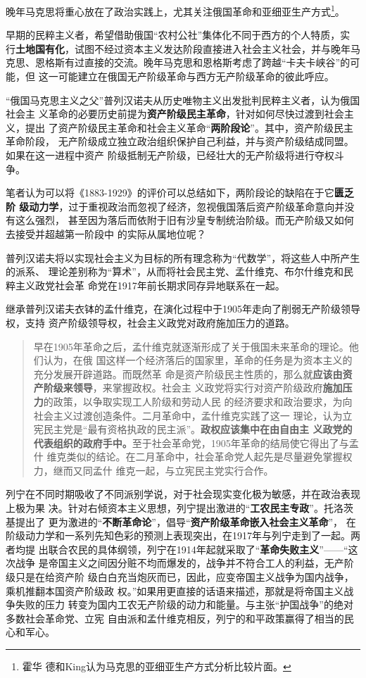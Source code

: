晚年马克思将重心放在了政治实践上，尤其关注俄国革命和亚细亚生产方式\footnote{霍华
  德和King认为马克思的亚细亚生产方式分析比较片面。}。

早期的民粹主义者，希望借助俄国“农村公社”集体化不同于西方的个人特质，实
行\textbf{土地国有化}，试图不经过资本主义发达阶段直接进入社会主义社会，并与晚年马
克思、恩格斯有过直接的交流。晚年马克思和恩格斯考虑了跨越``卡夫卡峡谷''的可能，但
这一可能建立在俄国无产阶级革命与西方无产阶级革命的彼此呼应。\cite{mamincui}

“俄国马克思主义之父”普列汉诺夫从历史唯物主义出发批判民粹主义者，认为俄国社会主
义革命的必要历史前提为\textbf{资产阶级民主革命}，针对如何尽快过渡到社会主义，提出
了资产阶级民主革命和社会主义革命“\textbf{两阶段论}”。其中，资产阶级民主革命阶段，
无产阶级成立独立政治组织保护自己利益，并与资产阶级结成同盟。如果在这一进程中资产
阶级抵制无产阶级，已经壮大的无产阶级将进行夺权斗争。

笔者认为可以将《1883-1929》的评价可以总结如下，两阶段论的缺陷在于它\textbf{匮乏阶
  级动力学}，过于重视政治而忽视了经济，忽视俄国落后资产阶级革命意向并没有这么强烈，
甚至因为落后而依附于旧有沙皇专制统治阶级。而无产阶级又如何去接受并超越第一阶段中
的实际从属地位呢？

普列汉诺夫将以实现社会主义为目标的所有理念称为“代数学”，将这些人中所产生的派系、
理论差别称为“算术”，从而将社会民主党、孟什维克、布尔什维克和民粹主义政党社会革
命党在1917年前长期求同存异地联系在一起。

继承普列汉诺夫衣钵的孟什维克，在演化过程中于1905年走向了削弱无产阶级领导权，支持
资产阶级领导权，社会主义政党对政府施加压力的道路。

\begin{quotation}
  早在1905年革命之后，孟什维克就逐渐形成了关于俄国未来革命的理论。他们认为，在俄
  国这样一个经济落后的国家里，革命的任务是为资本主义的充分发展开辟道路。而既然革
  命是资产阶级民主性质的，那么就\textbf{应该由资产阶级来领导}，来掌握政权。社会主
  义政党将实行对资产阶级政府\textbf{施加压力}的政策，以争取实现工人阶级和劳动人民
  的经济要求和政治要求，为向社会主义过渡创造条件。二月革命中，孟什维克实践了这一
  理论，认为立宪民主党是“最有资格执政的民主派”。\textbf{政权应该集中在由自由主
    义政党的代表组织的政府手中。}至于社会革命党，1905年革命的结局使它得出了与孟什
  维克类似的结论。在二月革命中，社会革命党人起先是尽量避免掌握权力，继而又同孟什
  维克一起，与立宪民主党实行合作。 
\end{quotation}

列宁在不同时期吸收了不同派别学说，对于社会现实变化极为敏感，并在政治表现上极为果
决。针对右倾资本主义思想，列宁提出激进的“\textbf{工农民主专政}”。托洛茨基提出了
更为激进的“\textbf{不断革命论}”，倡导“\textbf{资产阶级革命嵌入社会主义革命}”，
在阶级动力学和一系列先知色彩的预测上表现突出，在1917年与列宁走到了一起。两者均提
出联合农民的具体纲领，列宁在1914年起就采取了“\textbf{革命失败主义}”——“这次战争
是帝国主义之间因分赃不均而爆发的，战争并不符合工人的利益，无产阶级只是在给资产阶
级白白充当炮灰而已，因此，应变帝国主义战争为国内战争，乘机推翻本国资产阶级政
权。”\cite{shibaizhuyi}如果用更直接的话语来描述，那就是将帝国主义战争失败的压力
转变为国内工农无产阶级的动力和能量。与主张``护国战争''的绝对多数社会革命党、立宪
自由派和孟什维克相反，列宁的和平政策赢得了相当的民心和军心。


